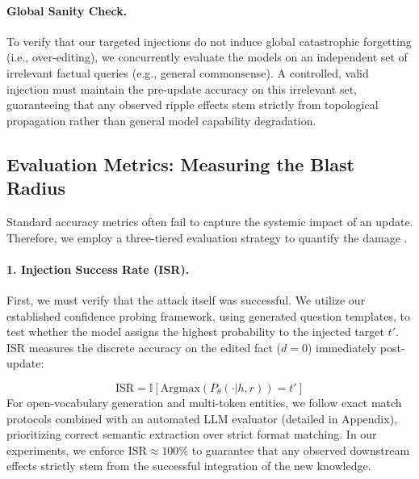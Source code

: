 \paragraph{Global Sanity Check.}
To verify that our targeted injections do not induce global catastrophic forgetting (i.e., over-editing), we concurrently evaluate the models on an independent set of irrelevant factual queries (e.g., general commonsense). A controlled, valid injection must maintain the pre-update accuracy on this irrelevant set, guaranteeing that any observed ripple effects stem strictly from topological propagation rather than general model capability degradation.

\subsection{Evaluation Metrics: Measuring the Blast Radius}
Standard accuracy metrics often fail to capture the systemic impact of an update. Therefore, we employ a three-tiered evaluation strategy to quantify the damage \cite{meng2022rome, cohen2023ripple}.

\paragraph{1. Injection Success Rate (ISR).}
First, we must verify that the attack itself was successful. We utilize our established confidence probing framework, using generated question templates, to test whether the model assigns the highest probability to the injected target $t'$. ISR measures the discrete accuracy on the edited fact ($d=0$) immediately post-update:

\begin{equation}
    \text{ISR} = \mathbb{I}[\text{Argmax}(P_{\theta}( \cdot | h, r)) = t']
\end{equation}
For open-vocabulary generation and multi-token entities, we follow exact match protocols combined with an automated LLM evaluator (detailed in Appendix), prioritizing correct semantic extraction over strict format matching. In our experiments, we enforce $\text{ISR} \approx 100\%$ to guarantee that any observed downstream effects strictly stem from the successful integration of the new knowledge.


